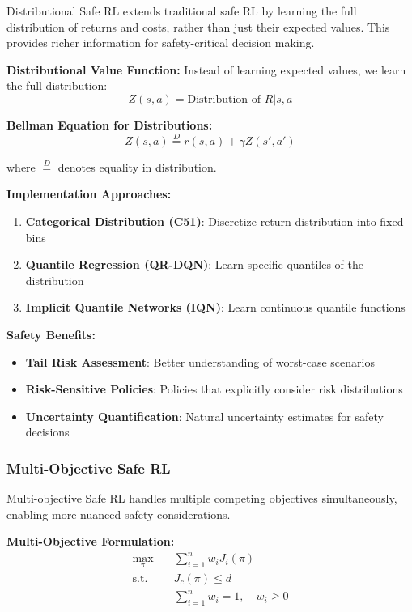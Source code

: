 \documentclass[12pt]{article}
\begin{document}
{{{{Distributional Safe RL extends traditional safe RL by learning the full distribution of returns and costs, rather than just their expected values. This provides richer information for safety-critical decision making.

\textbf{Distributional Value Function:}
Instead of learning expected values, we learn the full distribution:
\begin{equation}
Z(s,a) = \text{Distribution of } R|s,a
\end{equation}

\textbf{Bellman Equation for Distributions:}
\begin{equation}
Z(s,a) \overset{D}{=} r(s,a) + \gamma Z(s', a')
\end{equation}

where $\overset{D}{=}$ denotes equality in distribution.

\textbf{Implementation Approaches:}
\begin{enumerate}
\item \textbf{Categorical Distribution (C51)}: Discretize return distribution into fixed bins
\item \textbf{Quantile Regression (QR-DQN)}: Learn specific quantiles of the distribution
\item \textbf{Implicit Quantile Networks (IQN)}: Learn continuous quantile functions
\end{enumerate}

\textbf{Safety Benefits:}
\begin{itemize}
\item \textbf{Tail Risk Assessment}: Better understanding of worst-case scenarios
\item \textbf{Risk-Sensitive Policies}: Policies that explicitly consider risk distributions
\item \textbf{Uncertainty Quantification}: Natural uncertainty estimates for safety decisions
\end{itemize}

\subsubsection{Multi-Objective Safe RL}

Multi-objective Safe RL handles multiple competing objectives simultaneously, enabling more nuanced safety considerations.

\textbf{Multi-Objective Formulation:}
\begin{align}
\max_{\pi} \quad & \sum_{i=1}^{n} w_i J_i(\pi) \\
\text{s.t.} \quad & J_c(\pi) \leq d \\
& \sum_{i=1}^{n} w_i = 1, \quad w_i \geq 0
\end{align}

}}}}
\end{document}
